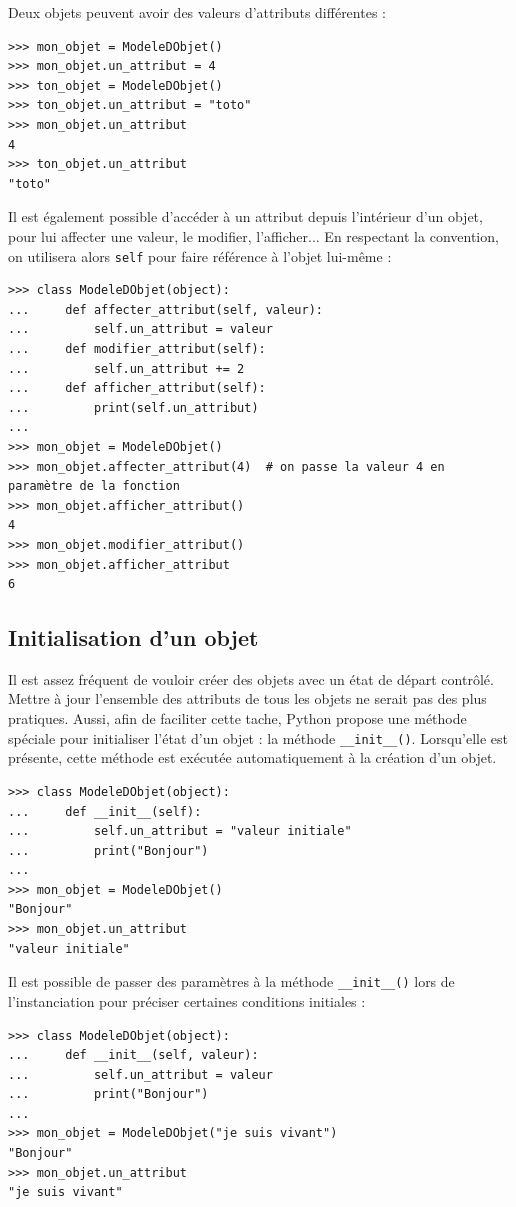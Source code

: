 \documentclass[12pt, a4paper]{article}
\begin{document}
Deux objets peuvent avoir des valeurs d'attributs différentes :
\begin{lstlisting}
>>> mon_objet = ModeleDObjet()
>>> mon_objet.un_attribut = 4
>>> ton_objet = ModeleDObjet()
>>> ton_objet.un_attribut = "toto"
>>> mon_objet.un_attribut
4
>>> ton_objet.un_attribut
"toto"
\end{lstlisting}

Il est également possible d'accéder à un attribut depuis l'intérieur d'un objet, pour lui affecter une valeur, le modifier, l'afficher... En respectant la convention, on utilisera alors \lstinline{self} pour faire référence à l'objet lui-même :
\begin{lstlisting}
>>> class ModeleDObjet(object):
...     def affecter_attribut(self, valeur):
...         self.un_attribut = valeur
...     def modifier_attribut(self):
...         self.un_attribut += 2
...     def afficher_attribut(self):
...         print(self.un_attribut)
...
>>> mon_objet = ModeleDObjet()
>>> mon_objet.affecter_attribut(4)  # on passe la valeur 4 en paramètre de la fonction
>>> mon_objet.afficher_attribut()
4
>>> mon_objet.modifier_attribut()
>>> mon_objet.afficher_attribut
6
\end{lstlisting}


\subsection{Initialisation d'un objet}
Il est assez fréquent de vouloir créer des objets avec un état de départ contrôlé. Mettre à jour l'ensemble des attributs de tous les objets ne serait pas des plus pratiques. Aussi, afin de faciliter cette tache, Python propose une méthode spéciale pour initialiser l'état d'un objet : la méthode \lstinline{__init__()}. Lorsqu'elle est présente, cette méthode est exécutée automatiquement à la création d'un objet.
\begin{lstlisting}
>>> class ModeleDObjet(object):
...     def __init__(self):
...         self.un_attribut = "valeur initiale"
...         print("Bonjour")
...
>>> mon_objet = ModeleDObjet()
"Bonjour"
>>> mon_objet.un_attribut
"valeur initiale"
\end{lstlisting}
	
Il est possible de passer des paramètres à la méthode \lstinline{__init__()} lors de l'instanciation pour préciser certaines conditions initiales :
\begin{lstlisting}
>>> class ModeleDObjet(object):
...     def __init__(self, valeur):
...         self.un_attribut = valeur
...         print("Bonjour")
...
>>> mon_objet = ModeleDObjet("je suis vivant")
"Bonjour"
>>> mon_objet.un_attribut
"je suis vivant"
\end{lstlisting}
\end{document}
